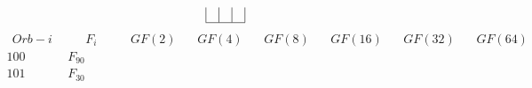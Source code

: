 \documentclass{article}
\begin{document}
{$$\begin{array}{|r|*{7}{r|}}
 & 
 & 
\\
\hline
\end{array}
$$
$$
\begin{array}{|r|*{7}{r|}}
\hline
\ \ Orb-i \ \ &\ \ \quad F_i \quad \ \   &\ \ GF(2)\ \ &\ \ GF(4)\ \ &\ \ GF(8)\ \ &\ \ GF(16)\ \ &\ \ GF(32)\ \ &\ \ GF(64)\ \ \\
\hline
100 
 & F_{90} &
 & 
 & 
 & 
 & 
 & 
\\
\hline
101 
 & F_{30} &
 & 
 & 
 & 
 & 
 & 

\end{array}$$}
\end{document}
